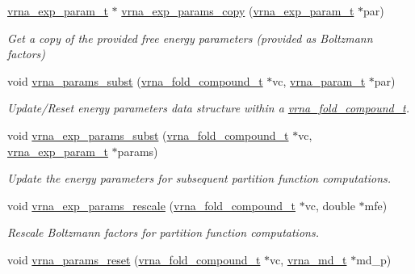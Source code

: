 \begin{DoxyCompactItemize}
\hyperlink{group__energy__parameters_ga01d8b92fe734df8d79a6169482c7d8d8}{vrna\+\_\+exp\+\_\+param\+\_\+t} $\ast$ \hyperlink{group__energy__parameters_ga70bc46be7cfa5434a71efe241c4f0609}{vrna\+\_\+exp\+\_\+params\+\_\+copy} (\hyperlink{group__energy__parameters_ga01d8b92fe734df8d79a6169482c7d8d8}{vrna\+\_\+exp\+\_\+param\+\_\+t} $\ast$par)
\begin{DoxyCompactList}\small\item\em Get a copy of the provided free energy parameters (provided as Boltzmann factors) \end{DoxyCompactList}\item 
void \hyperlink{group__energy__parameters_ga5d1909208f7ea3baa98b75afaa1f62ca}{vrna\+\_\+params\+\_\+subst} (\hyperlink{group__fold__compound_ga1b0cef17fd40466cef5968eaeeff6166}{vrna\+\_\+fold\+\_\+compound\+\_\+t} $\ast$vc, \hyperlink{group__energy__parameters_ga8a69ca7d787e4fd6079914f5343a1f35}{vrna\+\_\+param\+\_\+t} $\ast$par)
\begin{DoxyCompactList}\small\item\em Update/\+Reset energy parameters data structure within a \hyperlink{group__fold__compound_ga1b0cef17fd40466cef5968eaeeff6166}{vrna\+\_\+fold\+\_\+compound\+\_\+t}. \end{DoxyCompactList}\item 
void \hyperlink{group__energy__parameters_ga8e7ac4fab3b0cc03afbc134eaafb3525}{vrna\+\_\+exp\+\_\+params\+\_\+subst} (\hyperlink{group__fold__compound_ga1b0cef17fd40466cef5968eaeeff6166}{vrna\+\_\+fold\+\_\+compound\+\_\+t} $\ast$vc, \hyperlink{group__energy__parameters_ga01d8b92fe734df8d79a6169482c7d8d8}{vrna\+\_\+exp\+\_\+param\+\_\+t} $\ast$params)
\begin{DoxyCompactList}\small\item\em Update the energy parameters for subsequent partition function computations. \end{DoxyCompactList}\item 
void \hyperlink{group__energy__parameters_gad607bc3a5b5da16400e2ca4ea5560233}{vrna\+\_\+exp\+\_\+params\+\_\+rescale} (\hyperlink{group__fold__compound_ga1b0cef17fd40466cef5968eaeeff6166}{vrna\+\_\+fold\+\_\+compound\+\_\+t} $\ast$vc, double $\ast$mfe)
\begin{DoxyCompactList}\small\item\em Rescale Boltzmann factors for partition function computations. \end{DoxyCompactList}\item 
void \hyperlink{group__energy__parameters_gac40dc82e48a72a97cfc58b9da08a7792}{vrna\+\_\+params\+\_\+reset} (\hyperlink{group__fold__compound_ga1b0cef17fd40466cef5968eaeeff6166}{vrna\+\_\+fold\+\_\+compound\+\_\+t} $\ast$vc, \hyperlink{group__model__details_ga1f8a10e12a0a1915f2a4eff0b28ea17c}{vrna\+\_\+md\+\_\+t} $\ast$md\+\_\+p)

\end{DoxyCompactItemize}
